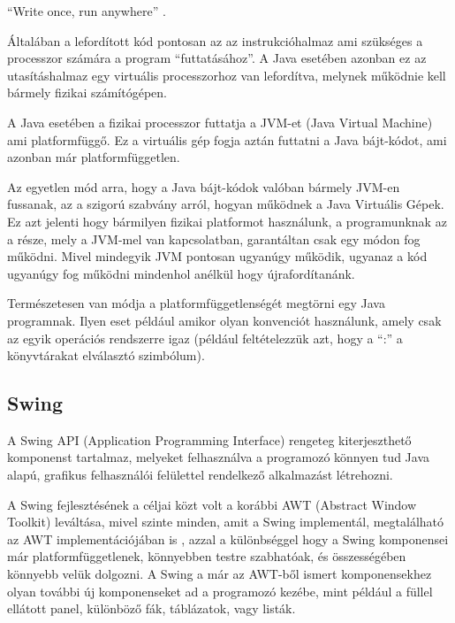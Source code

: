 \documentclass[a4paper,12pt]{report}
\begin{document}
``Write once, run anywhere'' \cite{wora}.

\vspace{2mm}
Általában a lefordított kód pontosan az az instrukcióhalmaz ami szükséges a processzor számára a program ``futtatásához''. A Java esetében azonban ez az utasításhalmaz egy virtuális processzorhoz van lefordítva, melynek működnie kell bármely fizikai számítógépen.

\vspace{2mm}
A Java esetében a fizikai processzor futtatja a JVM-et (Java Virtual Machine) ami platformfüggő. Ez a virtuális gép fogja aztán futtatni a Java bájt-kódot, ami azonban már platformfüggetlen. 

\vspace{2mm}
Az egyetlen mód arra, hogy a Java bájt-kódok valóban bármely JVM-en fussanak, az a szigorú szabvány arról, hogyan működnek a Java Virtuális Gépek. Ez azt jelenti hogy bármilyen fizikai platformot használunk, a programunknak az a része, mely a JVM-mel van kapcsolatban, garantáltan csak egy módon fog működni. Mivel mindegyik JVM pontosan ugyanúgy működik, ugyanaz a kód ugyanúgy fog működni mindenhol anélkül hogy újrafordítanánk.

\vspace{2mm}
Természetesen van módja a platformfüggetlenségét megtörni egy Java programnak. Ilyen eset például amikor olyan konvenciót használunk, amely csak az egyik operációs rendszerre igaz (például feltételezzük azt, hogy a ``:'' a könyvtárakat elválasztó szimbólum).

\subsection{Swing}
\label{swing}

A Swing API (Application Programming Interface) rengeteg kiterjeszthető komponenst tartalmaz, melyeket felhasználva a programozó könnyen tud Java alapú, grafikus felhasználói felülettel rendelkező alkalmazást létrehozni. 

\vspace{2mm}
A Swing fejlesztésének a céljai közt volt a korábbi AWT (Abstract Window Toolkit) leváltása, mivel szinte minden, amit a Swing implementál, megtalálható az AWT implementációjában is \cite{awt}, azzal a különbséggel hogy a Swing komponensei már platformfüggetlenek, könnyebben testre szabhatóak, és összességében könnyebb velük dolgozni. A Swing a már az AWT-ből ismert komponensekhez olyan további új komponenseket ad a programozó kezébe, mint például a füllel ellátott panel, különböző fák, táblázatok, vagy listák.
\end{document}
